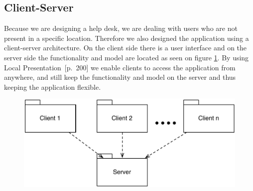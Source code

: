 \subsection{Client-Server}
Because we are designing a help desk, we are dealing with users who are not present in a specific location. Therefore we also designed the application using a client-server architecture.
On the client side there is a user interface and on the server side the functionality and model are located as seen on figure \ref{fig:client-server}. By using Local Presentation~\cite{roedeaalborg}[p.~200] we enable clients to access the application from anywhere, and still keep the functionality and model on the server and thus keeping the application flexible.         


\begin{figure}%
\centering
	\includegraphics[scale=0.5]{input/architectural_design/client-server-architecture-pattern.pdf}%
	\morscaption{}
	\label{fig:client-server}%
\end{figure}